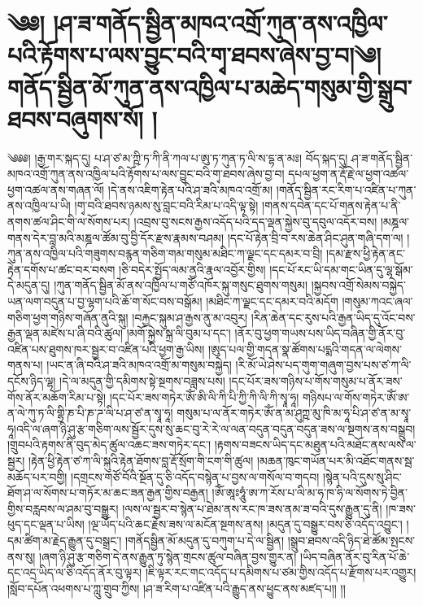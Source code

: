 \chapter{༄༅། །ཤ་ཟ་གནོད་སྦྱིན་མཁའ་འགྲོ་ཀུན་ནས་འཁྱིལ་པའི་རྟོགས་པ་ལས་བྱུང་བའི་གྭ་ཐབས་ཞེས་བྱ་བ།༄། གནོད་སྦྱིན་མོ་ཀུན་ནས་འཁྱིལ་པ་མཆེད་གསུམ་གྱི་སྒྲུབ་ཐབས་བཞུགས་སོ། །}༄༅༅། །རྒྱ་གར་སྐད་དུ། པ་ཤ་ཙ་མ་ཀྵི་ཏ་ཀི་ནི་ཀལ་པ་ཨུ་ཏ་ཀུན་ཏ་ལི་ས་དྷ་ན་མཿ། བོད་སྐད་དུ། ཤ་ཟ་གནོད་སྦྱིན་མཁའ་འགྲོ་ཀུན་ནས་འཁྱིལ་པའི་རྟོགས་པ་ལས་བྱུང་བའི་གྭ་ཐབས་ཞེས་བྱ་བ། དཔལ་ཕྱག་ན་རྡོ་རྗེ་ལ་ཕྱག་འཚལ་ཕྱག་འཚལ་ནས་གཞན་ལོ། །དེ་ནས་འཇིག་རྟེན་པའི་ཤ་ཟའི་མཁའ་འགྲོ་མ། །གནོད་སྦྱིན་རང་རིག་པ་འཛིན་པ་ཀུན་ནས་འཁྱིལ་པ་ཡི། །གྭ་བའི་ཐབས་ཉམས་སུ་བླང་བའི་རིམ་པ་འདི་ལྟ་སྟེ། །གནས་དབེན་དང་པོ་གནས་རྟེན་པ་ནི་ནགས་ཚལ་ཤིང་གི་ལ་སོགས་པར། །འབྲས་བུ་སངས་རྒྱས་འདོད་པའི་དད་ལྡན་སྐྱེས་བུ་དབུལ་འདོར་བས། །མཎྜལ་གནས་དེར་བླ་མའི་མཎྜལ་ཚོམ་བུ་བྱི་དོར་རྫས་རྣམས་བཤམ། །དང་པོ་རྟེན་བྲི་བ་རས་ཆེན་ཤིང་ཤུན་གཞི་དག་ལ། །ཀུན་ནས་འཁྱིལ་པའི་གཟུགས་བརྙན་གཅིག་གམ་གསུམ་མཐིང་ཀ་ལྗང་དང་དམར་བ་བྲི། །དམ་རྫས་ཕྱི་རྟེན་ནང་རྟེན་དགོས་པ་ཚང་བར་བསག །ཅི་བདེར་སྤྱོད་ལམ་ནྱའི་རྣལ་འབྱོར་གྱིས། །དང་པོ་རང་ཡི་དམ་གང་ཡིན་དུ་ལྷ་སྒོམ་དེ་མདུན་དུ། །ཀུན་གནོད་སྦྱིན་མོ་ནས་འཁྱིལ་པ་གཙོ་འཁོར་སྐུ་གསུང་ཐུགས་གསུམ། །སྐྱབས་འགྲོ་སེམས་བསྐྱེད་ཡན་ལག་བདུན་པ་བྱ་ལྷག་པའི་ཆོ་ག་སོང་བས་བསྒོམ། །མཐིང་ཀ་ལྗང་དང་དམར་བའི་མདོག །གསུམ་ཀའང་ཞལ་གཅིག་ཕྱག་གཉིས་གཞོན་ནུའི་སྐུ། །བརྐྱང་སྐུམ་ཤ་རྒྱས་ནུ་མ་འབུར། །རིན་ཆེན་དང་རུས་པའི་རྒྱན་ཡིད་དུ་འོང་བས་རྒྱན་ལྡན་མཛེས་པ་ཞི་བའི་ཚུལ། །མགོ་སྐྱེས་སྐྲ་ལི་བུམ་པ་དང་། །ནོར་བུ་ཕྱག་གཡས་པས་ཡིད་བཞིན་གྱི་ནོར་བུ་འཛིན་པས་ཐུགས་ཁར་སྦྱར་བ་འཛིན་པའི་ཕྱག་རྒྱ་ཡིས། །ཨུད་པལ་གྱི་གདན་སྣ་ཚོགས་པདྨའི་གདན་ལ་ལེགས་གནས་པ། །ཡང་ན་ཞི་བའི་ཤ་ཟའི་མཁའ་འགྲོ་མ་གསུམ་བསྐྱེད། །རི་མོ་ཡེ་ཤེས་པད་གུག་གཞུག་བྱས་པས་ཙ་ཀ་ལི་དངོས་ཉིད་ལྷ། །དེ་ལ་མདུན་གྱི་དམིགས་སྟེ་སྔགས་བཟླས་པས། །དང་པོར་ཟས་གཉིས་པ་གོས་གསུམ་པ་ནོར་ཟས་གོས་ནོར་མཆོག་རིམ་པ་སྟེ། །དང་པོར་ཟས་གཏེར་ཨོཾ་ཨི་ལི་ཀི་པི་ཀྱི་ཀི་ལི་ཀི་སྭཱ་ཧཱ། གཉིསཔ་ལ་གོས་གཏེར་ཨོཾ་ཨ་ན་ལེ་ཀུ་ཏ་ལི་གྷྲི་ཎ་པི་ཎ་ཌ་ལི་པ་ཤ་ཙ་ན་སྭཱ་ཧཱ། གསུམ་པ་ལ་ནོར་གཏེར་ཨོཾ་ན་མ་ཤུཀྵ་མུ་ཁི་མ་ཧཱ་པི་ཤ་ཙ་ན་མ་སྭཱ་ཧཱ།འདི་ལ་ཞག་ཉི་ཤུ་རྩ་གཅིག་ལས་སྦྱོར་དུས་སུ་ཆང་བུ་རེ་རེ་ལ་ལན་བདུན་བདུན་བདུན་ཟས་ལ་སྔགས་ནས་བསྒྲུབ། །གྲུབཔའི་རྟགས་ནི་བུད་མེད་ཚུལ་འཆང་ཟས་གཏེར་དང་། །རྟགས་བཟངས་ཡིད་དང་མཐུན་པའི་མཐོང་ནས་ལས་ལ་སྦྱར། །རྟེན་ཕྱི་རྟེན་ཙ་ཀ་ལི་སྐུའི་རྟེན་ཐོགས་བླ་རྡོ་སྲོག་གི་ངག་གི་ཚུལ། །མཆན་ཁུང་གཡོན་པར་མི་འཐོང་གནས་སྦ་མཆོད་པར་བགྱི། །དགྲངས་གཙོ་བོའི་སྔོན་དུ་ཅི་འདོད་བསྙེན་པ་བྱས་ལ་གསོལ་བ་གདབ། །སྙེན་པའི་དུས་སུ་ཤིང་ཐོག་ཤ་ལ་སོགས་པ་གཏོར་མ་ཆང་ཟན་རྒྱན་གྱིས་བརྒྱན། །ཨོཾ་ཨཱཿཧཱུཾ་ཨ་ཀ་རོས་པ་ལི་མ་ཧ་ཁ་ཧི་ལ་སོགས་ཏེ་བྱིན་གྱིས་བརླབས་ལ་ཤམ་བུ་བསྒྱུར། །ལས་ལ་སྦྱར་བ་སྙེན་པ་ཐེམ་ནས་རང་ཁ་ཟས་ནམ་ཟ་བའི་དུས་རྒྱུན་དུ་ནི། །ཁ་ཟས་ཕུད་དང་ལྡན་པ་ཡིས། །ལྔ་ཡོད་པའི་ཆང་རྗེས་ཟས་ལ་མངོན་སྔགས་ནས། །མདུན་དུ་བསྒྱུར་བས་ཅི་འདོད་འབྱུང་། །དམ་ཚིག་མ་རྗེད་རྒྱུན་དུ་བསྒྲང་། །གནོདསྦྱིན་མོ་མདུན་དུ་བཀུག་པ་དེ་ལ་སྦྱིན། །སྒྲུབ་ཐབས་འདི་ཉིད་ཐེ་ཚོམ་སྤངས་ནས་སུ། །ཞག་ཉི་ཤུ་རྩ་གཅིག་དེ་ནས་རྒྱུན་ཏུ་སྙེན་གྲངས་ཚུལ་བཞིན་བྱས་གྱུར་ན། །ཡིད་བཞིན་ནོར་བུ་རིན་པོ་ཆེ་དང་འདྲ་ཡིད་ལ་ཅི་འདོད་ནོར་བུ་ལྟར། །ཇི་ལྟར་རང་གང་འདོད་པ་དམིགས་པ་ཙམ་གྱིས་འདོད་པ་རྫོགས་པར་འགྱུར། །སློབ་དཔོན་འཕགས་པ་ཀླུ་གྲུབ་ཀྱིས། །ཤ་ཟ་རིག་པ་འཛིན་པའི་རྒྱུད་ནས་ཕྱུང་ནས་མཛད་པ།། །།